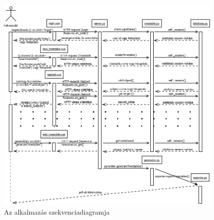 \begin{figure}
	\includegraphics[width=\linewidth]{images/szekvencia.png}
	\caption{Az alkalmazás szekvenciadiagramja}
\end{figure}



